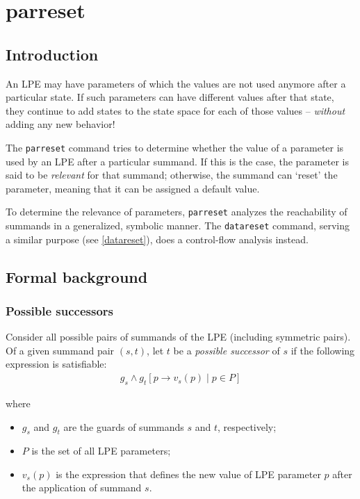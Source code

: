 \chapter{parreset}

\section{Introduction}

An LPE may have parameters of which the values are not used anymore after a particular state.
If such parameters can have different values after that state, they continue to add states to the state space for each of those values -- \emph{without} adding any new behavior!

The \texttt{parreset} command tries to determine whether the value of a parameter is used by an LPE after a particular summand.
If this is the case, the parameter is said to be \emph{relevant} for that summand; otherwise, the summand can `reset' the parameter, meaning that it can be assigned a default value.

To determine the relevance of parameters, \texttt{parreset} analyzes the reachability of summands in a generalized, symbolic manner.
The \texttt{datareset} command, serving a similar purpose (see \ref{datareset}), does a control-flow analysis instead.

\section{Formal background}

\subsection{Possible successors}

Consider all possible pairs of summands of the LPE (including symmetric pairs).
Of a given summand pair $(s, t)$, let $t$ be a \emph{possible successor} of $s$ if the following expression is satisfiable:
\begin{align*}
g_s \land {g_t}[p \rightarrow v_s(p) \;|\; p \in P]
\end{align*}

where

\begin{itemize}
\item $g_s$ and $g_t$ are the guards of summands $s$ and $t$, respectively;
\item $P$ is the set of all LPE parameters;
\item $v_s(p)$ is the expression that defines the new value of LPE parameter $p$ after the application of summand $s$.
\end{itemize}

